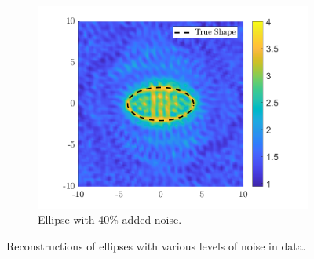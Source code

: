 \documentclass[]{article}
\begin{document}
\begin{figure}[h]
\begin{subfigure}{.3\textwidth}
						\centering
						\includegraphics[width = \textwidth]{Numeric Simulations/Images/ellipse-40-noise-reconstructed}
						\caption{Ellipse with 40\% added noise.}
					\end{subfigure}
					\caption{Reconstructions of ellipses with various levels of noise in data.}
					\label{fig:ellipsenoise}
				\end{figure}
\end{document}
